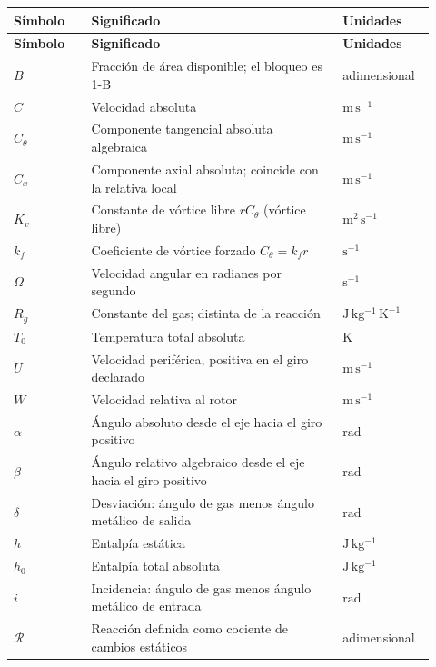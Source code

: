 \documentclass[10pt,openany]{book}
\begin{document}
\begingroup
\setlength{\LTpre}{0pt}
\setlength{\LTpost}{0pt}
\begin{longtable}{@{}>{\centering\arraybackslash}p{0.17\linewidth}>{\raggedright\arraybackslash}p{0.55\linewidth}>{\raggedright\arraybackslash}p{0.2\linewidth}@{}}
\textbf{Símbolo} & \textbf{Significado} & \textbf{Unidades} \\
\hline
\endfirsthead
\textbf{Símbolo} & \textbf{Significado} & \textbf{Unidades} \\
\hline
\endhead
$B$ & Fracción de área disponible; el bloqueo es 1-B & adimensional \\
$C$ & Velocidad absoluta & $\mathrm{m\,s^{-1}}$ \\
$C_{\theta}$ & Componente tangencial absoluta algebraica & $\mathrm{m\,s^{-1}}$ \\
$C_{x}$ & Componente axial absoluta; coincide con la relativa local & $\mathrm{m\,s^{-1}}$ \\
$K_v$ & Constante de vórtice libre $rC_\theta$ (vórtice libre) & $\mathrm{m^2\,s^{-1}}$ \\
$k_f$ & Coeficiente de vórtice forzado $C_\theta=k_f r$ & $\mathrm{s^{-1}}$ \\
$\Omega$ & Velocidad angular en radianes por segundo & $\mathrm{s^{-1}}$ \\
$R_{g}$ & Constante del gas; distinta de la reacción & $\mathrm{J\,kg^{-1}\,K^{-1}}$ \\
$T_{0}$ & Temperatura total absoluta & $\mathrm{K}$ \\
$U$ & Velocidad periférica, positiva en el giro declarado & $\mathrm{m\,s^{-1}}$ \\
$W$ & Velocidad relativa al rotor & $\mathrm{m\,s^{-1}}$ \\
$\alpha$ & Ángulo absoluto desde el eje hacia el giro positivo & $\mathrm{rad}$ \\
$\beta$ & Ángulo relativo algebraico desde el eje hacia el giro positivo & $\mathrm{rad}$ \\
$\delta$ & Desviación: ángulo de gas menos ángulo metálico de salida & $\mathrm{rad}$ \\
$h$ & Entalpía estática & $\mathrm{J\,kg^{-1}}$ \\
$h_{0}$ & Entalpía total absoluta & $\mathrm{J\,kg^{-1}}$ \\
$i$ & Incidencia: ángulo de gas menos ángulo metálico de entrada & $\mathrm{rad}$ \\
$\mathcal{R}$ & Reacción definida como cociente de cambios estáticos & adimensional \\

\end{longtable}
\end{document}
